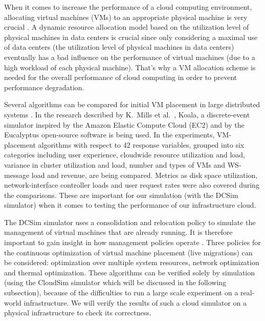\documentclass[conference, 10pt]{IEEEtran}
\begin{document}
When it comes to increase the performance of a cloud computing environment, allocating virtual machines (VMs) to an appropriate physical machine is very crucial \cite{cloudcomputing:allocation}. A dynamic resource allocation model based on the utilization level of physical machines in data centers is crucial since only considering a maximal use of data centers (the utilization level of physical machines in data centers) eventually has a bad influence on the performance of virtual machines (due to a high workload of each physical machine). That's why a VM allocation scheme is needed for the overall performance of cloud computing in order to prevent performance degradation.
	
Several algorithms can be compared for initial VM placement in large distributed systems \cite{VM:placementalgo}. In the research described by K.~Mills et al.~, Koala, a discrete-event simulator inspired by the Amazon Elastic Compute Cloud (EC2) and by the Eucalyptus open-source software is being used. In the experiments, VM-placement algorithms with respect to 42 response variables, grouped into six categories including user experience, cloudwide resource utilization and load, variance in cluster utilization and load, number and types of VMs and WS-message load and revenue, are being compared. 
Metrics as disk space utilization, network-interface controller loads and user request rates were also covered during the comparisons. These are important for our simulation (with the DCSim simulator) when it comes to testing the performance of our infrastructure cloud. 


The DCSim simulator uses a consolidation and relocation policy to simulate the management of virtual machines that are already running. It is therefore important to gain insight in how management policies operate \cite{datacenter:resourcemanag}.
Three policies for the continuous optimization of virtual machine placement (live migrations) can be considered: optimization over multiple system resources, network optimization and thermal optimization. These algorithms can be verified solely by simulation (using the CloudSim simulator which will be discussed in the following subsection), because of the difficulties to run a large scale experiment on a real-world infrastructure. We will verify the results of such a cloud simulator on a physical infrastructure to check its correctness.
\end{document}
